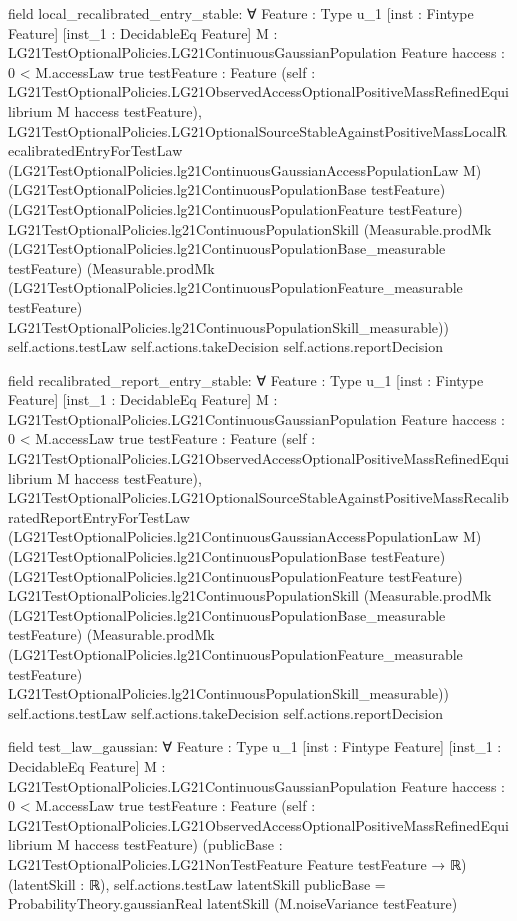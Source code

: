 \documentclass[10pt]{article}
\begin{document}
\begin{ReviewVerbatim}
field local_recalibrated_entry_stable:
∀ {Feature : Type u_1} [inst : Fintype Feature] [inst_1 : DecidableEq Feature]
  {M : LG21TestOptionalPolicies.LG21ContinuousGaussianPopulation Feature} {haccess : 0 < M.accessLaw {true}}
  {testFeature : Feature}
  (self : LG21TestOptionalPolicies.LG21ObservedAccessOptionalPositiveMassRefinedEquilibrium M haccess testFeature),
  LG21TestOptionalPolicies.LG21OptionalSourceStableAgainstPositiveMassLocalRecalibratedEntryForTestLaw
    (LG21TestOptionalPolicies.lg21ContinuousGaussianAccessPopulationLaw M)
    (LG21TestOptionalPolicies.lg21ContinuousPopulationBase testFeature)
    (LG21TestOptionalPolicies.lg21ContinuousPopulationFeature testFeature)
    LG21TestOptionalPolicies.lg21ContinuousPopulationSkill
    (Measurable.prodMk (LG21TestOptionalPolicies.lg21ContinuousPopulationBase_measurable testFeature)
      (Measurable.prodMk (LG21TestOptionalPolicies.lg21ContinuousPopulationFeature_measurable testFeature)
        LG21TestOptionalPolicies.lg21ContinuousPopulationSkill_measurable))
    self.actions.testLaw self.actions.takeDecision self.actions.reportDecision

field recalibrated_report_entry_stable:
∀ {Feature : Type u_1} [inst : Fintype Feature] [inst_1 : DecidableEq Feature]
  {M : LG21TestOptionalPolicies.LG21ContinuousGaussianPopulation Feature} {haccess : 0 < M.accessLaw {true}}
  {testFeature : Feature}
  (self : LG21TestOptionalPolicies.LG21ObservedAccessOptionalPositiveMassRefinedEquilibrium M haccess testFeature),
  LG21TestOptionalPolicies.LG21OptionalSourceStableAgainstPositiveMassRecalibratedReportEntryForTestLaw
    (LG21TestOptionalPolicies.lg21ContinuousGaussianAccessPopulationLaw M)
    (LG21TestOptionalPolicies.lg21ContinuousPopulationBase testFeature)
    (LG21TestOptionalPolicies.lg21ContinuousPopulationFeature testFeature)
    LG21TestOptionalPolicies.lg21ContinuousPopulationSkill
    (Measurable.prodMk (LG21TestOptionalPolicies.lg21ContinuousPopulationBase_measurable testFeature)
      (Measurable.prodMk (LG21TestOptionalPolicies.lg21ContinuousPopulationFeature_measurable testFeature)
        LG21TestOptionalPolicies.lg21ContinuousPopulationSkill_measurable))
    self.actions.testLaw self.actions.takeDecision self.actions.reportDecision

field test_law_gaussian:
∀ {Feature : Type u_1} [inst : Fintype Feature] [inst_1 : DecidableEq Feature]
  {M : LG21TestOptionalPolicies.LG21ContinuousGaussianPopulation Feature} {haccess : 0 < M.accessLaw {true}}
  {testFeature : Feature}
  (self : LG21TestOptionalPolicies.LG21ObservedAccessOptionalPositiveMassRefinedEquilibrium M haccess testFeature)
  (publicBase : LG21TestOptionalPolicies.LG21NonTestFeature Feature testFeature → ℝ) (latentSkill : ℝ),
  self.actions.testLaw latentSkill publicBase = ProbabilityTheory.gaussianReal latentSkill (M.noiseVariance testFeature)


\end{ReviewVerbatim}
\end{document}
